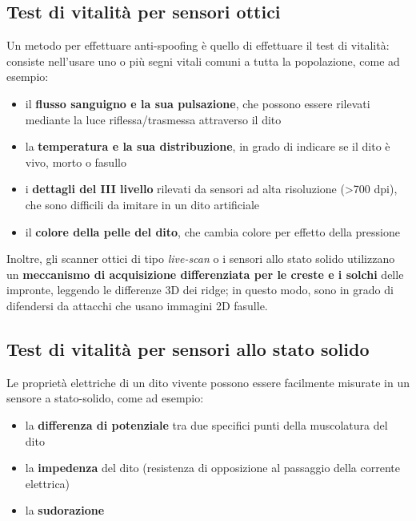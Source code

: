 \subsection{Test di vitalità per sensori ottici}
Un metodo per effettuare anti-spoofing è quello di effettuare il test di vitalità:
consiste nell'usare uno o più segni vitali comuni a tutta la popolazione,
come ad esempio:
\begin{itemize}
    \item il \textbf{flusso sanguigno e la sua pulsazione}, che possono essere rilevati mediante la luce riflessa/trasmessa attraverso il dito 
    \item la \textbf{temperatura e la sua distribuzione}, in grado di indicare se il dito è vivo, morto o fasullo
    \item i \textbf{dettagli del III livello} rilevati da sensori ad alta risoluzione (>700 dpi), che sono difficili da imitare in un dito artificiale
    \item il \textbf{colore della pelle del dito}, che cambia colore per effetto della pressione
\end{itemize}

Inoltre, gli scanner ottici di tipo \textit{live-scan} o i sensori allo stato solido 
utilizzano un \textbf{meccanismo di acquisizione differenziata per le creste e i solchi} delle impronte, 
leggendo le differenze 3D dei ridge; in questo modo, sono in grado di difendersi
da attacchi che usano immagini 2D fasulle.

\subsection{Test di vitalità per sensori allo stato solido}
Le proprietà elettriche di un dito vivente possono essere facilmente 
misurate in un sensore a stato-solido, come ad esempio:
\begin{itemize}
    \item la \textbf{differenza di potenziale} tra due specifici punti della muscolatura del dito
    \item la \textbf{impedenza} del dito (resistenza di opposizione al passaggio della corrente elettrica)
    \item la \textbf{sudorazione}
\end{itemize}